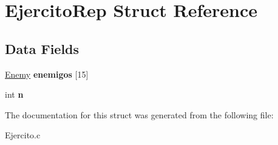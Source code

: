 \hypertarget{struct_ejercito_rep}{}\section{Ejercito\+Rep Struct Reference}
\label{struct_ejercito_rep}
\subsection*{Data Fields}
\begin{DoxyCompactItemize}
\item 
\mbox{\label{struct_ejercito_rep_a69f821c02ecc9f69695fd2af897e93d7}} 
\mbox{\hyperlink{_enemy_8h_a79aeea8a42dc103d27442b64a43d513d}{Enemy}} {\bfseries enemigos} \mbox{[}15\mbox{]}
\item 
\mbox{\label{struct_ejercito_rep_a4d088e8129b2c840e9db393fdd506b76}} 
int {\bfseries n}
\end{DoxyCompactItemize}


The documentation for this struct was generated from the following file\+:\begin{DoxyCompactItemize}
\item 
Ejercito.\+c\end{DoxyCompactItemize}
